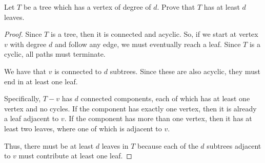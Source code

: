 \documentclass[../hw5]{subfiles}
\begin{document}
\begin{problem}
Let $T$ be a tree which has a vertex of degree of $d$. Prove that $T$ has at least $d$ leaves.
\end{problem}
\begin{proof}
	Since $T$ is a tree, then it is connected and acyclic.
	So, if we start at vertex  $v$ with degree  $d$ and follow any edge, we must eventually reach a leaf.
	Since $T$ is a cyclic, all paths must terminate.

	We have that $v$ is connected to  $d$ subtrees. Since these are also acyclic, they must end in at least one leaf.

	Specifically, $T-v$ has  $d$ connected components, each of which has at least one vertex and no cycles.
	If the component has exactly one vertex, then it is already a leaf adjacent to  $v$.
	If the component has more than one vertex, then it has at least two leaves, where one of which is adjacent to $v$.

	Thus,  there must be at least  $d$ leaves in  $T$ because each of the  $d$ subtrees adjacent to  $v$ must contribute at least one leaf.
\end{proof}
\end{document}
